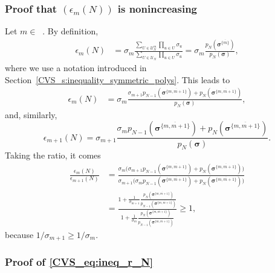 \documentclass[twoside,11pt]{book}
\numberwithin{theorem}{chapter}
\numberwithin{definition}{chapter}
\numberwithin{proposition}{chapter}
\numberwithin{corollary}{chapter}
\numberwithin{example}{chapter}
\numberwithin{lemma}{chapter}
\numberwithin{assumption}{chapter}
\numberwithin{equation}{chapter}
\numberwithin{figure}{chapter}
\DeclareMathOperator{\Ns}{\mathbb{N}^{*}}
\begin{document}
\subsubsection{Proof that $(\epsilon_{m}(N))$ is nonincreasing}
\label{CVS_s:epsilon_non_increasing}
Let $m \in \Ns$. By definition,
\begin{align}
\epsilon_{m}(N) & = \sigma_{m} \frac{\sum_{U \in \mathcal{U}_{N}^{m}} \prod_{u \in U} \sigma_{u}}{\sum_{U \in \mathcal{U}_{N}} \prod_{u \in U} \sigma_{u}} = \sigma_{m} \frac{p_{N}(\bm{\sigma}^{\overline{\{m\}}})}{p_{N}(\bm{\sigma})},
\end{align}
where we use a notation introduced in Section~\ref{CVS_s:inequality_symmetric_polys}. This leads to
\begin{align}
  \epsilon_{m}(N) & = \sigma_{m} \frac{ \sigma_{m+1}p_{N-1}(\bm{\sigma}^{\overline{\{m,m+1 \}}}) + p_{N}(\bm{\sigma}^{\overline{\{m,m+1 \}}})}{p_{N}(\bm{\sigma})},
\end{align}
and, similarly,
\begin{equation}
\epsilon_{m+1}(N) = \sigma_{m+1} \frac{ \sigma_{m}p_{N-1}(\bm{\sigma}^{\overline{\{m,m+1 \}}}) + p_{N}(\bm{\sigma}^{\overline{\{m,m+1 \}}})}{p_{N}(\bm{\sigma})}.
\end{equation}
Taking the ratio, it comes
\begin{align}
\frac{\epsilon_{m}(N)}{\epsilon_{m+1}(N)} & = \frac{\sigma_{m} \bigg( \sigma_{m+1}p_{N-1}\left(\bm{\sigma}^{\overline{\{m,m+1 \}}} \right) + p_{N} \left(\bm{\sigma}^{\overline{\{m,m+1 \}}} \right)\bigg)}{\sigma_{m+1} \bigg( \sigma_{m}p_{N-1}\left(\bm{\sigma}^{\overline{\{m,m+1 \}}} \right) + p_{N} \left(\bm{\sigma}^{\overline{\{m,m+1 \}}}\right)\bigg)}\\
& = \frac{1  + \frac{1}{\sigma_{m+1}}\frac{p_{N} \left(\bm{\sigma}^{\overline{\{m,m+1 \}}} \right) }{ p_{N-1} \left(\bm{\sigma}^{\overline{\{m,m+1 \}}} \right)} }{1  + \frac{1}{\sigma_{m} }\frac{p_{N} \left(\bm{\sigma}^{\overline{\{m,m+1 \}}} \right) }{p_{N-1} \left(\bm{\sigma}^{\overline{\{m,m+1 \}}}\right)}} \geq 1,
\end{align}
because $1/\sigma_{m+1} \geq 1/\sigma_{m}$.

\subsubsection{Proof of \eqref{CVS_eq:ineq_r_N}}\label{CVS_app:proof_ineq_r_N}
\end{document}
